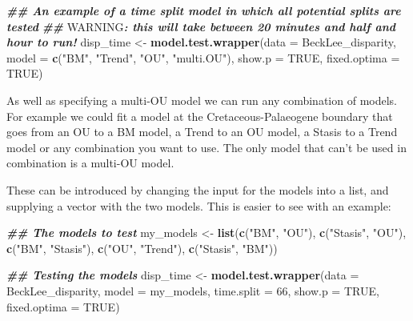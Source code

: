 \documentclass[
]{book}
\newenvironment{Shaded}{\begin{snugshade}}{\end{snugshade}}
\newcommand{\AlertTok}[1]{\textcolor[rgb]{0.94,0.16,0.16}{#1}}
\newcommand{\AttributeTok}[1]{\textcolor[rgb]{0.13,0.29,0.53}{#1}}
\newcommand{\ConstantTok}[1]{\textcolor[rgb]{0.56,0.35,0.01}{#1}}
\newcommand{\DecValTok}[1]{\textcolor[rgb]{0.00,0.00,0.81}{#1}}
\newcommand{\DocumentationTok}[1]{\textcolor[rgb]{0.56,0.35,0.01}{\textbf{\textit{#1}}}}
\newcommand{\FunctionTok}[1]{\textcolor[rgb]{0.13,0.29,0.53}{\textbf{#1}}}
\newcommand{\NormalTok}[1]{#1}
\newcommand{\OtherTok}[1]{\textcolor[rgb]{0.56,0.35,0.01}{#1}}
\newcommand{\StringTok}[1]{\textcolor[rgb]{0.31,0.60,0.02}{#1}}
\begin{document}
\begin{Shaded}
\begin{Highlighting}[]
\DocumentationTok{\#\# An example of a time split model in which all potential splits are tested}
\DocumentationTok{\#\# }\AlertTok{WARNING}\DocumentationTok{: this will take between 20 minutes and half and hour to run!}
\NormalTok{disp\_time }\OtherTok{\textless{}{-}} \FunctionTok{model.test.wrapper}\NormalTok{(}\AttributeTok{data =}\NormalTok{ BeckLee\_disparity,}
                        \AttributeTok{model =} \FunctionTok{c}\NormalTok{(}\StringTok{"BM"}\NormalTok{, }\StringTok{"Trend"}\NormalTok{, }\StringTok{"OU"}\NormalTok{, }\StringTok{"multi.OU"}\NormalTok{),}
                                \AttributeTok{show.p =} \ConstantTok{TRUE}\NormalTok{, }\AttributeTok{fixed.optima =} \ConstantTok{TRUE}\NormalTok{)}
\end{Highlighting}
\end{Shaded}

As well as specifying a multi-OU model we can run any combination of models.
For example we could fit a model at the Cretaceous-Palaeogene boundary that goes from an OU to a BM model, a Trend to an OU model, a Stasis to a Trend model or any combination you want to use.
The only model that can't be used in combination is a multi-OU model.

These can be introduced by changing the input for the models into a list, and supplying a vector with the two models.
This is easier to see with an example:

\begin{Shaded}
\begin{Highlighting}[]
\DocumentationTok{\#\# The models to test}
\NormalTok{my\_models }\OtherTok{\textless{}{-}} \FunctionTok{list}\NormalTok{(}\FunctionTok{c}\NormalTok{(}\StringTok{"BM"}\NormalTok{, }\StringTok{"OU"}\NormalTok{),}
                  \FunctionTok{c}\NormalTok{(}\StringTok{"Stasis"}\NormalTok{, }\StringTok{"OU"}\NormalTok{),}
                  \FunctionTok{c}\NormalTok{(}\StringTok{"BM"}\NormalTok{, }\StringTok{"Stasis"}\NormalTok{),}
                  \FunctionTok{c}\NormalTok{(}\StringTok{"OU"}\NormalTok{, }\StringTok{"Trend"}\NormalTok{),}
                  \FunctionTok{c}\NormalTok{(}\StringTok{"Stasis"}\NormalTok{, }\StringTok{"BM"}\NormalTok{))}

\DocumentationTok{\#\# Testing the models}
\NormalTok{disp\_time }\OtherTok{\textless{}{-}} \FunctionTok{model.test.wrapper}\NormalTok{(}\AttributeTok{data =}\NormalTok{ BeckLee\_disparity,}
                                \AttributeTok{model =}\NormalTok{ my\_models, }\AttributeTok{time.split =} \DecValTok{66}\NormalTok{,}
                                \AttributeTok{show.p =} \ConstantTok{TRUE}\NormalTok{, }\AttributeTok{fixed.optima =} \ConstantTok{TRUE}\NormalTok{)}
\end{Highlighting}
\end{Shaded}
\end{document}
